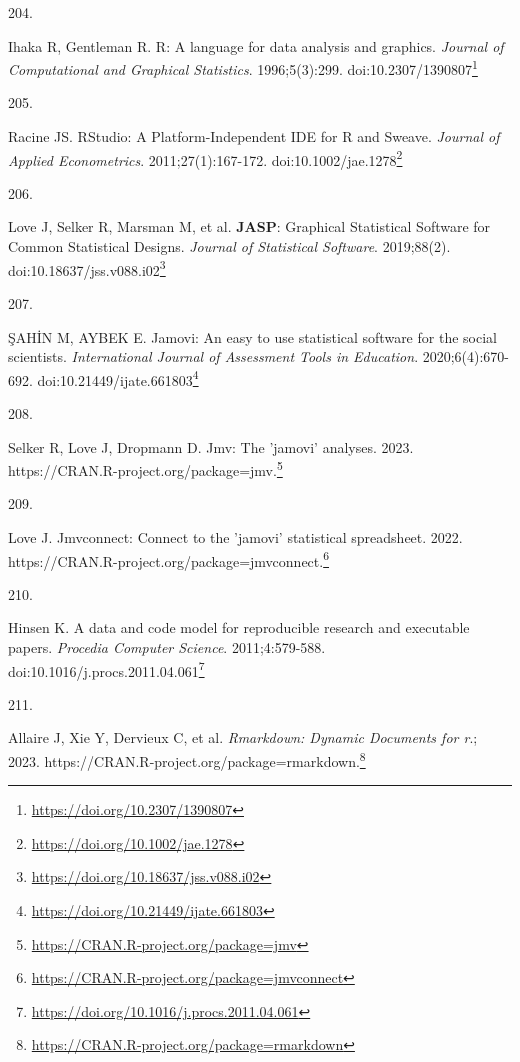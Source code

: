 \documentclass[
  a4paper,
]{book}
\newlength{\cslhangindent}
\newlength{\csllabelwidth}
\newlength{\cslentryspacingunit} %
\newenvironment{CSLReferences}[2] %
 {%
  \setlength{\parindent}{0pt}
  \ifodd #1
  \let\oldpar\par
  \def\par{\hangindent=\cslhangindent\oldpar}
  \fi
  \setlength{\parskip}{#2\cslentryspacingunit}
 }%
 {}
\newcommand{\CSLLeftMargin}[1]{\parbox[t]{\csllabelwidth}{#1}}
\newcommand{\CSLRightInline}[1]{\parbox[t]{\linewidth - \csllabelwidth}{#1}\break}
\renewcommand{\href}[2]{#2\footnote{\url{#1}}}
\begin{document}
\begin{CSLReferences}{0}{0}
\leavevmode{}%
\CSLLeftMargin{204. }%
\CSLRightInline{Ihaka R, Gentleman R. R: A language for data analysis and graphics. \emph{Journal of Computational and Graphical Statistics}. 1996;5(3):299. doi:\href{https://doi.org/10.2307/1390807}{10.2307/1390807}}

\leavevmode{}%
\CSLLeftMargin{205. }%
\CSLRightInline{Racine JS. RStudio: A Platform{-}Independent IDE for R and Sweave. \emph{Journal of Applied Econometrics}. 2011;27(1):167-172. doi:\href{https://doi.org/10.1002/jae.1278}{10.1002/jae.1278}}

\leavevmode{}%
\CSLLeftMargin{206. }%
\CSLRightInline{Love J, Selker R, Marsman M, et al. {\textbf{JASP}}: Graphical Statistical Software for Common Statistical Designs. \emph{Journal of Statistical Software}. 2019;88(2). doi:\href{https://doi.org/10.18637/jss.v088.i02}{10.18637/jss.v088.i02}}

\leavevmode{}%
\CSLLeftMargin{207. }%
\CSLRightInline{ŞAHİN M, AYBEK E. Jamovi: An easy to use statistical software for the social scientists. \emph{International Journal of Assessment Tools in Education}. 2020;6(4):670-692. doi:\href{https://doi.org/10.21449/ijate.661803}{10.21449/ijate.661803}}

\leavevmode{}%
\CSLLeftMargin{208. }%
\CSLRightInline{Selker R, Love J, Dropmann D. Jmv: The 'jamovi' analyses. 2023. \href{https://CRAN.R-project.org/package=jmv}{https://CRAN.R-project.org/package=jmv.}}

\leavevmode{}%
\CSLLeftMargin{209. }%
\CSLRightInline{Love J. Jmvconnect: Connect to the 'jamovi' statistical spreadsheet. 2022. \href{https://CRAN.R-project.org/package=jmvconnect}{https://CRAN.R-project.org/package=jmvconnect.}}

\leavevmode{}%
\CSLLeftMargin{210. }%
\CSLRightInline{Hinsen K. A data and code model for reproducible research and executable papers. \emph{Procedia Computer Science}. 2011;4:579-588. doi:\href{https://doi.org/10.1016/j.procs.2011.04.061}{10.1016/j.procs.2011.04.061}}

\leavevmode{}%
\CSLLeftMargin{211. }%
\CSLRightInline{Allaire J, Xie Y, Dervieux C, et al. \emph{Rmarkdown: Dynamic Documents for r}.; 2023. \href{https://CRAN.R-project.org/package=rmarkdown}{https://CRAN.R-project.org/package=rmarkdown.}}


\end{CSLReferences}
\end{document}
